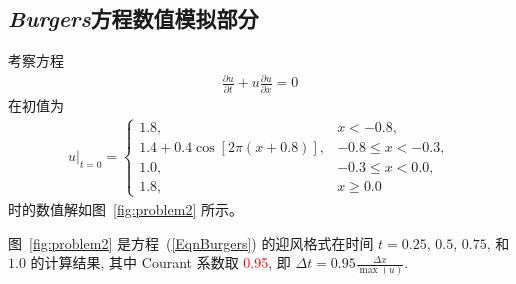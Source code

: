 \documentclass[10.5pt
]{article}
\begin{document}
\subsection{\textit{Burgers}方程数值模拟部分}
考察方程
\begin{align}
\frac{\partial u}{\partial t} + u \frac{\partial u}{\partial x} = 0
\end{align}
在初值为
\begin{align}
u|_{t=0} = \left\{\begin{array}{ll} 1.8, & x < -0.8,
\\
1.4 + 0.4 \cos\left[2 \pi (x + 0.8) \right], & -0.8 \le x < -0.3,
\\
1.0, & -0.3 \le x < 0.0,
\\
1.8, & x \ge 0.0
\end{array} \right.
\end{align}
时的数值解如图~\ref{fig:problem2} 所示。

图~\ref{fig:problem2} 是方程~(\ref{EqnBurgers}) 的迎风格式在时间 $t = 0.25$, $0.5$, $0.75$, 和 $1.0$ 的计算结果, 其中 Courant 系数取 \textcolor{red}{0.95},
即 $\Delta t = 0.95 \frac{\Delta x}{\max(u)}$.
\end{document}
